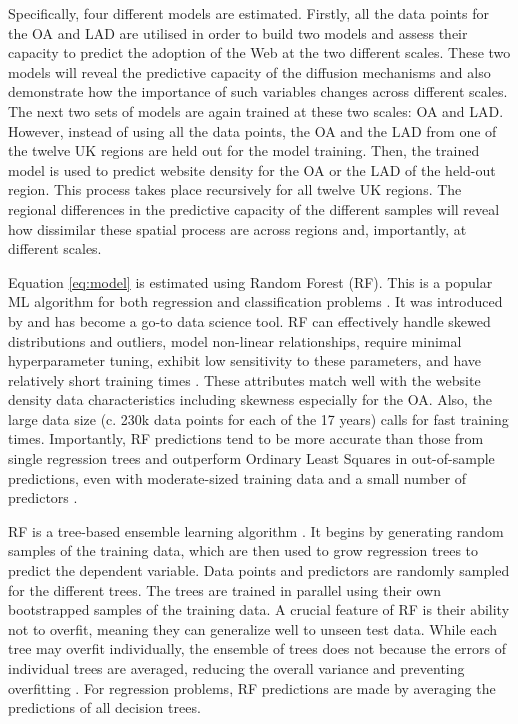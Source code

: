 \documentclass[
  authoryear,
  preprint,
  3p]{elsarticle}
\begin{document}
Specifically, four different models are estimated. Firstly, all the data
points for the OA and LAD are utilised in order to build two models and
assess their capacity to predict the adoption of the Web at the two
different scales. These two models will reveal the predictive capacity
of the diffusion mechanisms and also demonstrate how the importance of
such variables changes across different scales. The next two sets of
models are again trained at these two scales: OA and LAD. However,
instead of using all the data points, the OA and the LAD from one of the
twelve UK regions are held out for the model training. Then, the trained
model is used to predict website density for the OA or the LAD of the
held-out region. This process takes place recursively for all twelve UK
regions. The regional differences in the predictive capacity of the
different samples will reveal how dissimilar these spatial process are
across regions and, importantly, at different scales.

Equation \ref{eq:model} is estimated using Random Forest (RF). This is a
popular ML algorithm for both regression and classification problems
\citep{biau2012analysis}. It was introduced by \citet{breiman2001random}
and has become a go-to data science tool. RF can effectively handle
skewed distributions and outliers, model non-linear relationships,
require minimal hyperparameter tuning, exhibit low sensitivity to these
parameters, and have relatively short training times
\citep{Caruana2008, liaw2002classification, yan2020using}. These
attributes match well with the website density data characteristics
including skewness especially for the OA. Also, the large data size (c.
230k data points for each of the 17 years) calls for fast training
times. Importantly, RF predictions tend to be more accurate than those
from single regression trees and outperform Ordinary Least Squares in
out-of-sample predictions, even with moderate-sized training data and a
small number of predictors
\citep{mullainathan2017machine, athey2019machine, sulaiman2011intelligent, pourebrahim2019trip, biau2012analysis}.

RF is a tree-based ensemble learning algorithm
\citep{breiman2001random}. It begins by generating random samples of the
training data, which are then used to grow regression trees to predict
the dependent variable. Data points and predictors are randomly sampled
for the different trees. The trees are trained in parallel using their
own bootstrapped samples of the training data. A crucial feature of RF
is their ability not to overfit, meaning they can generalize well to
unseen test data. While each tree may overfit individually, the ensemble
of trees does not because the errors of individual trees are averaged,
reducing the overall variance and preventing overfitting
\citep{last2002improving}. For regression problems, RF predictions are
made by averaging the predictions of all decision trees.
\end{document}
